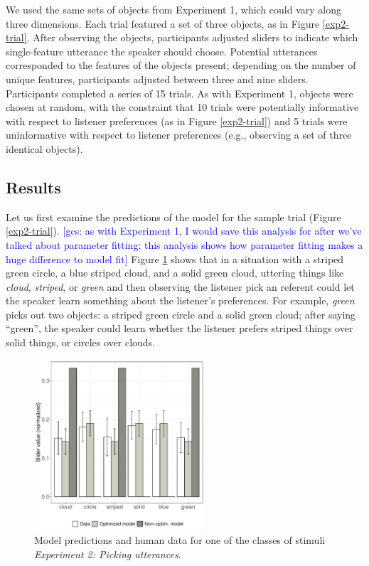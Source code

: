 \documentclass[10pt,a4paper]{article}
\newcommand{\gcs}[1]{\textcolor{blue}{[gcs: #1]}}
\begin{document}
We used the same sets of objects from Experiment 1, which could vary along three dimensions. Each trial featured a set of three objects, as in Figure \ref{exp2-trial}. After observing the objects, participants adjusted sliders to indicate which single-feature utterance the speaker should choose. Potential utterances corresponded to the features of the objects present; depending on the number of unique features, participants adjusted between three and nine sliders. Participants completed a series of 15 trials. As with Experiment 1, objects were chosen at random, with the constraint that 10 trials were potentially informative with respect to listener preferences (as in Figure \ref{exp2-trial}) and 5 trials were uninformative with respect to listener preferences (e.g., observing a set of three identical objects).



\subsection{Results}

Let us first examine the predictions of the model for the sample trial (Figure \ref{exp2-trial}). \gcs{as with Experiment 1, I would save this analysis for after we've talked about parameter fitting; this analysis shows how parameter fitting makes a huge difference to model fit} Figure \ref{barplot_x3} shows that in a situation with a  striped green circle, a blue striped cloud, and a solid green  cloud, uttering things like \textit{cloud}, \textit{striped}, or \textit{green} and then observing the listener pick an referent could let the speaker learn something about the listener's preferences. For example, \textit{green} picks out two objects: a striped green circle and a solid green cloud; after saying ``green'', the speaker could learn whether the listener prefers striped things over solid things, or circles over clouds.

\begin{figure}[ht!]
	\centering
	\includegraphics[width=2.5in]{images/barplot_x3.pdf}
	\caption{Model predictions and human data for one of the classes of stimuli \emph{Experiment 2: Picking utterances}.}\label{barplot_x3}
\end{figure}
\end{document}
